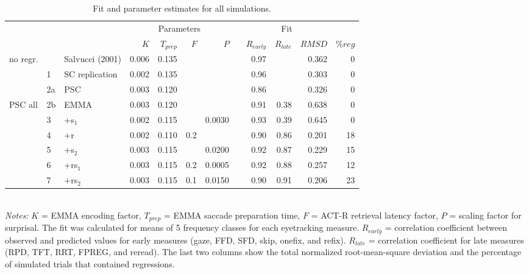 \begin{table}
\centering
\begin{tabular}{lllrrrrrrrrr}
\hline
 & & & \multicolumn{4}{c}{Parameters} & & \multicolumn{3}{c}{Fit} & \\ \cline{4-7} \cline{9-11}
  &   &   & $K$ & $T_{prep}$ & $F$ & $P$ &   & $R_{early}$ & $R_{late}$ & $RMSD$ & $\%reg$ \\ 
 \hline
no regr. &  & Salvucci (2001) & 0.006 & 0.135 &  &  &  & 0.97 &  & 0.362 & 0 \\ 
   & 1 & SC replication & 0.002 & 0.135 &  &  &  & 0.96 &  & 0.303 & 0 \\ 
   & 2a & PSC & 0.003 & 0.120 &  &  &  & 0.86 &  & 0.326 & 0 \\ 
 \hline
PSC all & 2b & EMMA & 0.003 & 0.120 &  &  &  & 0.91 & 0.38 & 0.638 & 0 \\ 
   & 3 & +s$_1$ & 0.002 & 0.115 &  & 0.0030 &  & 0.93 & 0.39 & 0.645 & 0 \\ 
   & 4 & +r & 0.002 & 0.110 & 0.2 &  &  & 0.90 & 0.86 & 0.201 & 18 \\ 
   & 5 & +s$_2$ & 0.003 & 0.115 &  & 0.0200 &  & 0.92 & 0.87 & 0.229 & 15 \\ 
   & 6 & +rs$_1$ & 0.003 & 0.115 & 0.2 & 0.0005 &  & 0.92 & 0.88 & 0.257 & 12 \\ 
   & 7 & +rs$_2$ & 0.003 & 0.115 & 0.1 & 0.0150 &  & 0.90 & 0.91 & 0.206 & 23 \\
 \hline 
\end{tabular} \\ 
\footnotesize{
\emph{Notes:} $K$ = EMMA encoding factor, $T_{prep}$ = EMMA saccade preparation time, $F$ = ACT-R retrieval latency factor, $P$ = scaling factor for surprisal. The fit was calculated for means of 5 frequency classes for each eyetracking measure. $R_{early}$ = correlation coefficient between observed and predicted values for early measures (gaze, FFD, SFD, skip, onefix, and refix). $R_{late}$ = correlation coefficient for late measures (RPD, TFT, RRT, FPREG, and reread). The last two columns show the total normalized root-mean-square deviation and the percentage of simulated trials that contained regressions.}
\caption{Fit and parameter estimates for all simulations.}\label{simtable}
\end{table}

